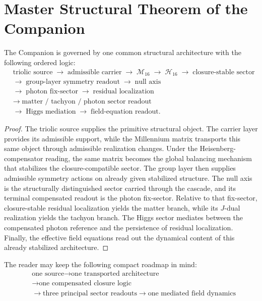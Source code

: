 \section{Master Structural Theorem of the Companion}
\label{sec:master-structural-theorem}


\begin{theorem}
\label{thm:master-structural}
The Companion is governed by one common structural architecture with the
following ordered logic:
\[
\begin{aligned}
&\text{triolic source}
 \;\longrightarrow\;
 \text{admissible carrier}
 \;\longrightarrow\;
 \mathcal M_{16}
 \;\longrightarrow\;
 \mathcal H_{16}
 \;\longrightarrow\;
 \text{closure-stable sector}\\[0.2em]
&\longrightarrow\;\text{group-layer symmetry readout}
 \;\longrightarrow\;\text{null axis}\\[0.2em]
&\longrightarrow\;\text{photon fix-sector}
 \;\longrightarrow\;\text{residual localization}\\[0.2em]
&\longrightarrow\;\text{matter / tachyon / photon sector readout}\\[0.2em]
&\longrightarrow\;\text{Higgs mediation}
 \;\longrightarrow\;\text{field-equation readout}.
\end{aligned}
\]
\end{theorem}

\begin{proof}
The triolic source supplies the primitive structural object. The carrier layer
provides its admissible support, while the Millennium matrix transports this
same object through admissible realization changes. Under the
Heisenberg-compensator reading, the same matrix becomes the global balancing
mechanism that stabilizes the closure-compatible sector. The group layer then
supplies admissible symmetry actions on already given stabilized structure.
The null axis is the structurally distinguished sector carried through the
cascade, and its terminal compensated readout is the photon fix-sector.
Relative to that fix-sector, closure-stable residual localization yields the
matter branch, while its $J$-dual realization yields the tachyon branch. The
Higgs sector mediates between the compensated photon reference and the
persistence of residual localization. Finally, the effective field equations
read out the dynamical content of this already stabilized architecture.
\end{proof}

\begin{remark}
The reader may keep the following compact roadmap in mind:
\[
\boxed{\begin{aligned}
&\text{one source} \to \text{one transported architecture}\\
&\to \text{one compensated closure logic}\\
&\to \text{three principal sector readouts} \to \text{one mediated field dynamics}
\end{aligned}}
\]
\end{remark}

